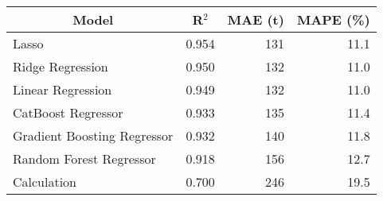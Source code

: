 
\begin{tabular}[t]{lrrr}
\toprule
\multicolumn{1}{c}{Model} & \multicolumn{1}{c}{R$^2$} & \multicolumn{1}{c}{MAE (t)} & \multicolumn{1}{c}{MAPE (\%)}\\
\midrule
Lasso & 0.954 & 131 & 11.1\\
Ridge Regression & 0.950 & 132 & 11.0\\
Linear Regression & 0.949 & 132 & 11.0\\
CatBoost Regressor & 0.933 & 135 & 11.4\\
Gradient Boosting Regressor & 0.932 & 140 & 11.8\\
Random Forest Regressor & 0.918 & 156 & 12.7\\
Calculation & 0.700 & 246 & 19.5\\
\bottomrule
\end{tabular}
